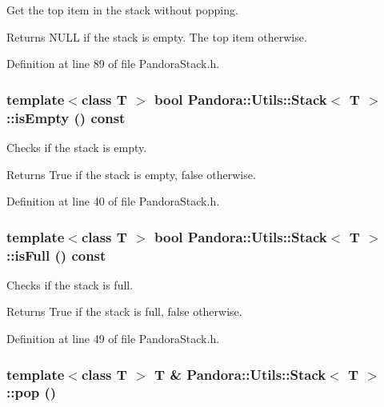 Get the top item in the stack without popping. \begin{DoxyReturn}{Returns}
NULL if the stack is empty. The top item otherwise. 
\end{DoxyReturn}


Definition at line 89 of file PandoraStack.h.\hypertarget{classPandora_1_1Utils_1_1Stack_a163441b950b324b28db471e793e20c62}{
\subsubsection[{isEmpty}]{\setlength{\rightskip}{0pt plus 5cm}template$<$class T $>$ bool {\bf Pandora::Utils::Stack}$<$ T $>$::isEmpty () const}}
\label{classPandora_1_1Utils_1_1Stack_a163441b950b324b28db471e793e20c62}


Checks if the stack is empty. \begin{DoxyReturn}{Returns}
True if the stack is empty, false otherwise. 
\end{DoxyReturn}


Definition at line 40 of file PandoraStack.h.\hypertarget{classPandora_1_1Utils_1_1Stack_aceefd2e5cbc10a11bcbaa3d73cd78bbc}{
\subsubsection[{isFull}]{\setlength{\rightskip}{0pt plus 5cm}template$<$class T $>$ bool {\bf Pandora::Utils::Stack}$<$ T $>$::isFull () const}}
\label{classPandora_1_1Utils_1_1Stack_aceefd2e5cbc10a11bcbaa3d73cd78bbc}


Checks if the stack is full. \begin{DoxyReturn}{Returns}
True if the stack is full, false otherwise. 
\end{DoxyReturn}


Definition at line 49 of file PandoraStack.h.\hypertarget{classPandora_1_1Utils_1_1Stack_a2ef38d630c91e48b425799887621433f}{
\subsubsection[{pop}]{\setlength{\rightskip}{0pt plus 5cm}template$<$class T $>$ T \& {\bf Pandora::Utils::Stack}$<$ T $>$::pop ()}}
\label{classPandora_1_1Utils_1_1Stack_a2ef38d630c91e48b425799887621433f}


